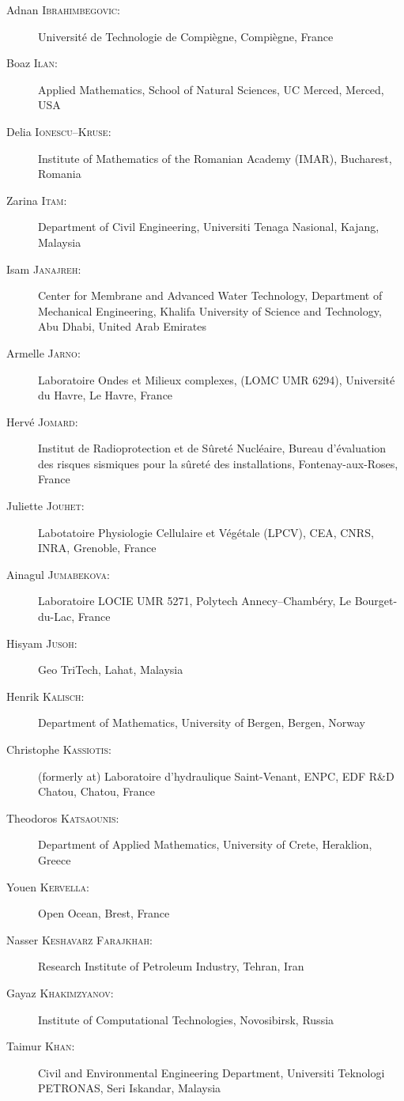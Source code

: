 \begin{description}
  \item[Adnan \textsc{Ibrahimbegovic}:] Universit\'e de Technologie de Compi\`egne, Compi\`egne, France
  \item[Boaz \textsc{Ilan}:] Applied Mathematics, School of Natural Sciences, UC Merced, Merced, USA
  \item[Delia \textsc{Ionescu--Kruse}:] Institute of Mathematics of the Romanian Academy (IMAR), Bucharest, Romania
  \item[Zarina \textsc{Itam}:] Department of Civil Engineering, Universiti Tenaga Nasional, Kajang, Malaysia
  \item[Isam \textsc{Janajreh}:] Center for Membrane and Advanced Water Technology, Department of Mechanical Engineering, Khalifa University of Science and Technology, Abu Dhabi, United Arab Emirates
  \item[Armelle \textsc{Jarno}:] Laboratoire Ondes et Milieux complexes, (LOMC UMR 6294), Universit\'e du Havre, Le Havre, France
  \item[Herv\'e \textsc{Jomard}:] Institut de Radioprotection et de S\^uret\'e Nucl\'eaire, Bureau d'\'evaluation des risques sismiques pour la s\^uret\'e des installations, Fontenay-aux-Roses, France
  \item[Juliette \textsc{Jouhet}:] Labotatoire Physiologie Cellulaire et V\'eg\'etale (LPCV), CEA, CNRS, INRA, Grenoble, France
  \item[Ainagul \textsc{Jumabekova}:] Laboratoire LOCIE UMR 5271, Polytech Annecy--Chamb\'ery, Le Bourget-du-Lac, France
  \item[Hisyam \textsc{Jusoh}:] Geo TriTech, Lahat, Malaysia
  \item[Henrik \textsc{Kalisch}:] Department of Mathematics, University of Bergen, Bergen, Norway
  \item[Christophe \textsc{Kassiotis}:] (formerly at) Laboratoire d'hydraulique Saint-Venant, ENPC, EDF R\&D Chatou, Chatou, France
  \item[Theodoros \textsc{Katsaounis}:] Department of Applied Mathematics, University of Crete, Heraklion, Greece
  \item[Youen \textsc{Kervella}:] Open Ocean, Brest, France
  \item[Nasser \textsc{Keshavarz Farajkhah}:] Research Institute of Petroleum Industry, Tehran, Iran
  \item[Gayaz \textsc{Khakimzyanov}:] Institute of Computational Technologies, Novosibirsk, Russia
  \item[Taimur \textsc{Khan}:] Civil and Environmental Engineering Department, Universiti Teknologi PETRONAS, Seri Iskandar, Malaysia

\end{description}

